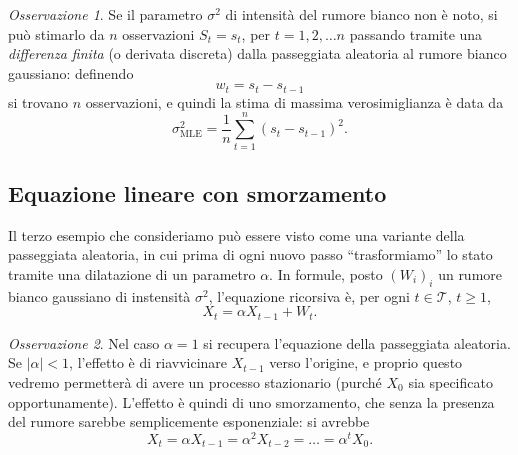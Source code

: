 \documentclass[
  italian,
  letterpaper,
]{book}
\newcommand{\mle}{\operatorname{MLE}}
\theoremstyle{definition}
\theoremstyle{remark}
\newtheorem*{remark}{Osservazione}
\begin{document}
\begin{remark}
Se il parametro \(\sigma^2\) di intensità del rumore bianco non è noto,
si può stimarlo da \(n\) osservazioni \(S_t = s_t\), per
\(t=1,2, \ldots n\) passando tramite una \emph{differenza finita} (o
derivata discreta) dalla passeggiata aleatoria al rumore bianco
gaussiano: definendo \[ w_t = s_t - s_{t-1}\] si trovano \(n\)
osservazioni, e quindi la stima di massima verosimiglianza è data da
\[ \sigma_{\mle}^2 = \frac 1 n \sum_{t=1}^n  (s_t - s_{t-1})^2.\]
\end{remark}

\subsection{Equazione lineare con
smorzamento}\label{equazione-lineare-con-smorzamento}

Il terzo esempio che consideriamo può essere visto come una variante
della passeggiata aleatoria, in cui prima di ogni nuovo passo
``trasformiamo'' lo stato tramite una dilatazione di un parametro
\(\alpha\). In formule, posto \((W_i)_{i}\) un rumore bianco gaussiano
di instensità \(\sigma^2\), l'equazione ricorsiva è, per ogni
\(t \in \mathcal{T}\), \(t \ge 1\), \[  X_t = \alpha X_{t-1} + W_t.\]

\begin{remark}
Nel caso \(\alpha=1\) si recupera l'equazione della passeggiata
aleatoria. Se \(|\alpha | < 1\), l'effetto è di riavvicinare \(X_{t-1}\)
verso l'origine, e proprio questo vedremo permetterà di avere un
processo stazionario (purché \(X_0\) sia specificato opportunamente).
L'effetto è quindi di uno smorzamento, che senza la presenza del rumore
sarebbe semplicemente esponenziale: si avrebbe
\[X_t = \alpha X_{t-1} = \alpha^2 X_{t-2} = \ldots = \alpha^t X_0.\]
\end{remark}
\end{document}
